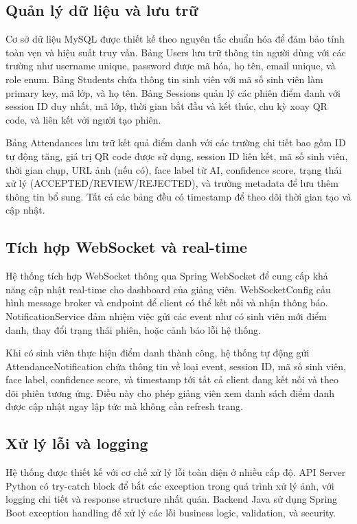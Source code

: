 \documentclass[12pt,a4paper]{report}
\begin{document}
\subsection{Quản lý dữ liệu và lưu trữ}
Cơ sở dữ liệu MySQL được thiết kế theo nguyên tắc chuẩn hóa để đảm bảo tính toàn vẹn và hiệu suất truy vấn. Bảng Users lưu trữ thông tin người dùng với các trường như username unique, password được mã hóa, họ tên, email unique, và role enum. Bảng Students chứa thông tin sinh viên với mã số sinh viên làm primary key, mã lớp, và họ tên. Bảng Sessions quản lý các phiên điểm danh với session ID duy nhất, mã lớp, thời gian bắt đầu và kết thúc, chu kỳ xoay QR code, và liên kết với người tạo phiên.

Bảng Attendances lưu trữ kết quả điểm danh với các trường chi tiết bao gồm ID tự động tăng, giá trị QR code được sử dụng, session ID liên kết, mã số sinh viên, thời gian chụp, URL ảnh (nếu có), face label từ AI, confidence score, trạng thái xử lý (ACCEPTED/REVIEW/REJECTED), và trường metadata để lưu thêm thông tin bổ sung. Tất cả các bảng đều có timestamp để theo dõi thời gian tạo và cập nhật.

\subsection{Tích hợp WebSocket và real-time}
Hệ thống tích hợp WebSocket thông qua Spring WebSocket để cung cấp khả năng cập nhật real-time cho dashboard của giảng viên. WebSocketConfig cấu hình message broker và endpoint để client có thể kết nối và nhận thông báo. NotificationService đảm nhiệm việc gửi các event như có sinh viên mới điểm danh, thay đổi trạng thái phiên, hoặc cảnh báo lỗi hệ thống.

Khi có sinh viên thực hiện điểm danh thành công, hệ thống tự động gửi AttendanceNotification chứa thông tin về loại event, session ID, mã số sinh viên, face label, confidence score, và timestamp tới tất cả client đang kết nối và theo dõi phiên tương ứng. Điều này cho phép giảng viên xem danh sách điểm danh được cập nhật ngay lập tức mà không cần refresh trang.

\subsection{Xử lý lỗi và logging}
Hệ thống được thiết kế với cơ chế xử lý lỗi toàn diện ở nhiều cấp độ. API Server Python có try-catch block để bắt các exception trong quá trình xử lý ảnh, với logging chi tiết và response structure nhất quán. Backend Java sử dụng Spring Boot exception handling để xử lý các lỗi business logic, validation, và security.
\end{document}
